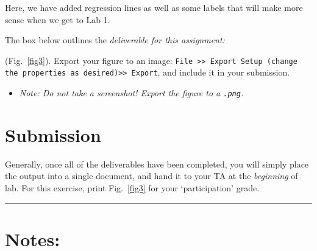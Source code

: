 \documentclass[11pt, letterpaper]{article}
\begin{document}
Here, we have added regression lines as well as some labels that will make more sense when we get to Lab 1.

\n
The box below outlines the \it{deliverable} for this assignment:

\begin{formal}
    \begin{deliv}  (Fig.~\ref{fig3}). Export your figure to an image: \texttt{File >> Export Setup (change the properties as desired)>> Export}, and include it in your submission.
    \end{deliv}
\end{formal}

\begin{itemize}
    \item \textit{Note: Do not take a screenshot! Export the figure to a \texttt{.png}.}
\end{itemize}

\section*{Submission}

Generally, once all of the deliverables have been completed, you will simply place the output into a single document, and hand it to your TA at the \textit{beginning} of lab. For this exercise, print Fig.~\ref{fig3} for your `participation' grade.

\vspace{5mm}
\hrule

\newpage


\section*{Notes:}
\end{document}
